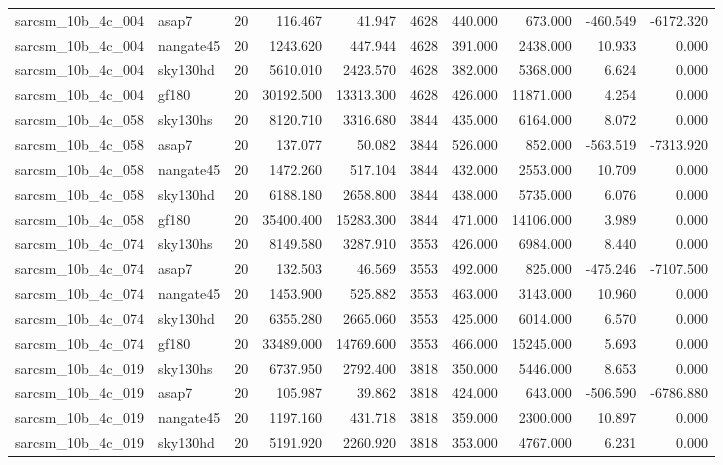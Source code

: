 \begin{longtable}{llrrrrrrrr}
sarcsm\_10b\_4c\_004 & asap7 & 20 & 116.467 & 41.947 & 4628 & 440.000 & 673.000 & -460.549 & -6172.320 \\
sarcsm\_10b\_4c\_004 & nangate45 & 20 & 1243.620 & 447.944 & 4628 & 391.000 & 2438.000 & 10.933 & 0.000 \\
sarcsm\_10b\_4c\_004 & sky130hd & 20 & 5610.010 & 2423.570 & 4628 & 382.000 & 5368.000 & 6.624 & 0.000 \\
sarcsm\_10b\_4c\_004 & gf180 & 20 & 30192.500 & 13313.300 & 4628 & 426.000 & 11871.000 & 4.254 & 0.000 \\
sarcsm\_10b\_4c\_058 & sky130hs & 20 & 8120.710 & 3316.680 & 3844 & 435.000 & 6164.000 & 8.072 & 0.000 \\
sarcsm\_10b\_4c\_058 & asap7 & 20 & 137.077 & 50.082 & 3844 & 526.000 & 852.000 & -563.519 & -7313.920 \\
sarcsm\_10b\_4c\_058 & nangate45 & 20 & 1472.260 & 517.104 & 3844 & 432.000 & 2553.000 & 10.709 & 0.000 \\
sarcsm\_10b\_4c\_058 & sky130hd & 20 & 6188.180 & 2658.800 & 3844 & 438.000 & 5735.000 & 6.076 & 0.000 \\
sarcsm\_10b\_4c\_058 & gf180 & 20 & 35400.400 & 15283.300 & 3844 & 471.000 & 14106.000 & 3.989 & 0.000 \\
sarcsm\_10b\_4c\_074 & sky130hs & 20 & 8149.580 & 3287.910 & 3553 & 426.000 & 6984.000 & 8.440 & 0.000 \\
sarcsm\_10b\_4c\_074 & asap7 & 20 & 132.503 & 46.569 & 3553 & 492.000 & 825.000 & -475.246 & -7107.500 \\
sarcsm\_10b\_4c\_074 & nangate45 & 20 & 1453.900 & 525.882 & 3553 & 463.000 & 3143.000 & 10.960 & 0.000 \\
sarcsm\_10b\_4c\_074 & sky130hd & 20 & 6355.280 & 2665.060 & 3553 & 425.000 & 6014.000 & 6.570 & 0.000 \\
sarcsm\_10b\_4c\_074 & gf180 & 20 & 33489.000 & 14769.600 & 3553 & 466.000 & 15245.000 & 5.693 & 0.000 \\
sarcsm\_10b\_4c\_019 & sky130hs & 20 & 6737.950 & 2792.400 & 3818 & 350.000 & 5446.000 & 8.653 & 0.000 \\
sarcsm\_10b\_4c\_019 & asap7 & 20 & 105.987 & 39.862 & 3818 & 424.000 & 643.000 & -506.590 & -6786.880 \\
sarcsm\_10b\_4c\_019 & nangate45 & 20 & 1197.160 & 431.718 & 3818 & 359.000 & 2300.000 & 10.897 & 0.000 \\
sarcsm\_10b\_4c\_019 & sky130hd & 20 & 5191.920 & 2260.920 & 3818 & 353.000 & 4767.000 & 6.231 & 0.000 \\

\end{longtable}

